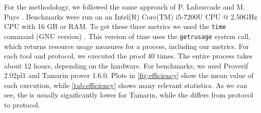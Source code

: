 For the methodology, we followed the same approach of P. Lafourcade and M. Puys \cite{lafourcade:hal-01306395}. Benchmarks were run on an Intel(R) Core(TM) i5-7200U CPU @ 2.50GHz CPU with 16 GB or RAM. To get these three metrics we used the \lstinline{time} command (GNU version) \cite{time_command}. This version of time uses the \lstinline{getrusage} system call, which returns resource usage measures for a process, including our metrics. For each tool and protocol, we executed the proof 40 times. The entire process takes about 12 hours, depending on the hardware. For benchmarks, we used Proverif 2.02pl1 and Tamarin prover 1.6.0. Plots in \cref{fig:efficiency} show the mean value of each execution, while \cref{tab:efficiency} shows many relevant statistics. As we can see, the \mrss{} is usually significantly lower for Tamarin, while the \wct{} differs from protocol to protocol.

